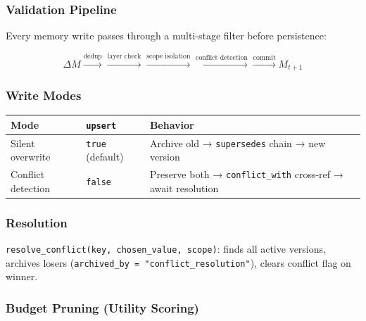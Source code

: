 \documentclass[11pt]{article}
\begin{document}
\subsubsection{Validation Pipeline}\label{validation-pipeline}

Every memory write passes through a multi-stage filter before
persistence:

\[\Delta M \xrightarrow{\text{dedup}} \xrightarrow{\text{layer check}} \xrightarrow{\text{scope isolation}} \xrightarrow{\text{conflict detection}} \xrightarrow{\text{commit}} M_{t+1}\]

\subsubsection{Write Modes}\label{write-modes}

\begin{longtable}[]{@{}
  >{\raggedright\arraybackslash}p{}
  >{\raggedright\arraybackslash}p{}
  >{\raggedright\arraybackslash}p{}@{}}
\toprule\noalign{}
\begin{minipage}[b]{\linewidth}\raggedright
Mode
\end{minipage} & \begin{minipage}[b]{\linewidth}\raggedright
\texttt{upsert}
\end{minipage} & \begin{minipage}[b]{\linewidth}\raggedright
Behavior
\end{minipage} \\
\midrule\noalign{}
\endhead
\bottomrule\noalign{}
\endlastfoot
Silent overwrite & \texttt{true} (default) & Archive old →
\texttt{supersedes} chain → new version \\
Conflict detection & \texttt{false} & Preserve both →
\texttt{conflict\_with} cross-ref → await resolution \\
\end{longtable}

\subsubsection{Resolution}\label{resolution}

\texttt{resolve\_conflict(key,\ chosen\_value,\ scope)}: finds all
active versions, archives losers
(\texttt{archived\_by\ =\ "conflict\_resolution"}), clears conflict flag
on winner.

\subsubsection{Budget Pruning (Utility
Scoring)}\label{budget-pruning-utility-scoring}
\end{document}
